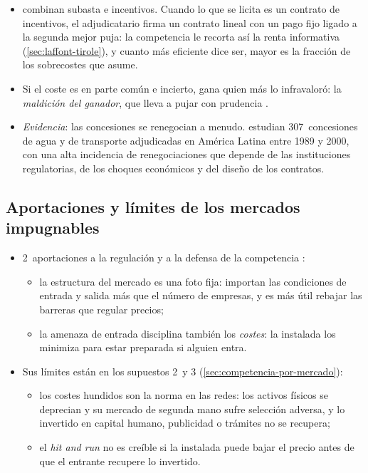 \documentclass[11pt]{article}
\begin{document}
\begin{itemize}
\item \textcite{LaffontTirole1987Auctioning} combinan subasta e incentivos. Cuando lo que se licita es un contrato de incentivos, el adjudicatario firma un contrato lineal con un pago fijo ligado a la segunda mejor puja: la competencia le recorta así la renta informativa (\ref{sec:laffont-tirole}), y cuanto más eficiente dice ser, mayor es la fracción de los sobrecostes que asume.
\item Si el coste es en parte común e incierto, gana quien más lo infravaloró: la \emph{maldición del ganador}, que lleva a pujar con prudencia .
\item \emph{Evidencia}: las concesiones se renegocian a menudo. \textcite{GuaschLaffontStraub2008Renegotiation} estudian 307~concesiones de agua y de transporte adjudicadas en América Latina entre 1989 y 2000, con una alta incidencia de renegociaciones que depende de las instituciones regulatorias, de los choques económicos y del diseño de los contratos.
\end{itemize}

\subsection{Aportaciones y límites de los mercados impugnables}\label{anexo:impugnables}

\begin{itemize}
\item 2~aportaciones a la regulación y a la defensa de la competencia\nocite{BaumolPanzarWillig1982Contestable} :
  \begin{itemize}
  \item la estructura del mercado es una foto fija: importan las condiciones de entrada y salida más que el número de empresas, y es más útil rebajar las barreras que regular precios;
  \item la amenaza de entrada disciplina también los \emph{costes}: la instalada los minimiza para estar preparada si alguien entra.
  \end{itemize}
\item Sus límites están en los supuestos 2~y 3 (\ref{sec:competencia-por-mercado}):
  \begin{itemize}
  \item los costes hundidos son la norma en las redes: los activos físicos se deprecian y su mercado de segunda mano sufre selección adversa\nocite{Akerlof1970Market}, y lo invertido en capital humano, publicidad o trámites no se recupera;
  \item el \emph{hit and run} no es creíble si la instalada puede bajar el precio antes de que el entrante recupere lo invertido.
  \end{itemize}
\end{itemize}
\end{document}
